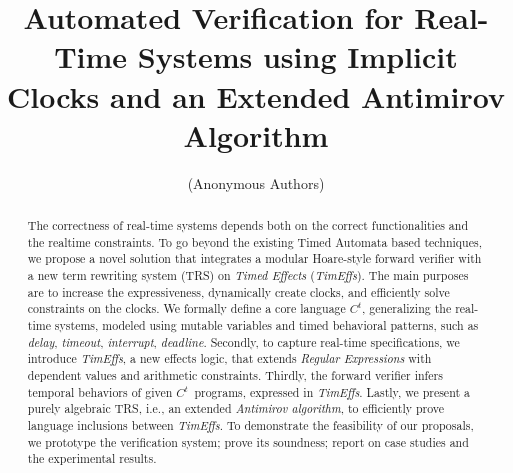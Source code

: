 \documentclass[10pt,conference]{IEEEtran}
\newcommand{\timedEffects}{\emph{TimEffs}}
\newcommand{\timedL}{\code{C^{t}}}
\newcommand{\code}[1]{{\tt{\ensuremath{\m{#1}}}}}
\newcommand{\m}{\mathit}
\begin{document}
\title{Automated Verification for Real-Time Systems 
using Implicit Clocks and an Extended Antimirov Algorithm}

\author{(Anonymous Authors)}

\begin{comment}
\author{\IEEEauthorblockN{1\textsuperscript{st} Given Name Surname}
\IEEEauthorblockA{\textit{dept. name of organization (of Aff.)} \\
\textit{name of organization (of Aff.)}\\
City, Country \\
email address or ORCID}
\and
\IEEEauthorblockN{2\textsuperscript{nd} Given Name Surname}
\IEEEauthorblockA{\textit{dept. name of organization (of Aff.)} \\
\textit{name of organization (of Aff.)}\\
City, Country \\
email address or ORCID}
}
\end{comment}

\maketitle

\begin{abstract}
    The correctness of real-time systems 
    depends both on the correct functionalities and the realtime constraints.
    To go beyond the existing Timed Automata based techniques, 
    we propose a novel solution that integrates a 
    modular Hoare-style forward verifier with a new term rewriting 
    system (TRS) on \emph{Timed Effects} (\timedEffects).
    The main purposes are to increase the expressiveness,  
    dynamically create clocks, 
    and efficiently solve constraints on the clocks.  
    We formally define 
    a core language \timedL, generalizing the real-time systems, modeled 
    using mutable variables and timed behavioral patterns, 
    such as \emph{delay}, \emph{timeout}, \emph{interrupt}, \emph{deadline}. 
    Secondly, to capture real-time specifications, 
    we introduce \timedEffects, a new effects logic, 
    that extends 
    \emph{Regular Expressions} with dependent
    values and arithmetic constraints.
    Thirdly,  the forward verifier infers temporal behaviors of given 
    \timedL\ programs, expressed in \timedEffects. 
    Lastly, we present a purely algebraic TRS, i.e., an extended \emph{Antimirov algorithm}, to 
    efficiently prove language inclusions between 
     \timedEffects. 
    To demonstrate the feasibility of our proposals, 
    we prototype the verification system; prove its 
    soundness; report on case studies and the experimental results.     
\end{abstract}
\end{document}
